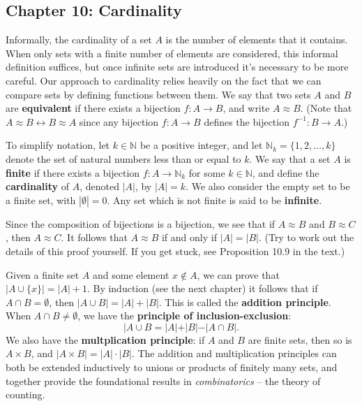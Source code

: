 \documentclass[letterpaper,12pt]{article}
\newcommand{\N}{\mathbb{N}}
\begin{document}
\subsection*{Chapter 10: Cardinality}
Informally, the cardinality of a set $A$ is the number of elements that it contains. When only sets with a finite number of elements are considered, this informal definition suffices, but once infinite sets are introduced it's necessary to be more careful. Our approach to cardinality relies heavily on the fact that we can compare sets by defining functions between them. We say that two sets $A$ and $B$ are {\bf equivalent} if there exists a bijection $f:A\to B$, and write $A\approx B$. (Note that $A\approx B \leftrightarrow B\approx A$ since any bijection $f:A\to B$ defines the bijection $f^{-1}:B\to A$.)

To simplify notation, let $k\in\N$ be a positive integer, and let $\N_k = \{1,2,\ldots, k\}$ denote the set of natural numbers less than or equal to $k$. We say that a set $A$ is {\bf finite} if there exists a bijection $f:A\to \N_k$ for some $k\in\N$, and define the {\bf cardinality} of $A$, denoted $|A|$, by $|A|=k$. We also consider the empty set to be a finite set, with $|\emptyset|=0$. Any set which is not finite is said to be {\bf infinite}.

Since the composition of bijections is a bijection, we see that if $A\approx B$ and $B\approx C$, then $A\approx C$. It follows that $A\approx B$ if and only if $|A| = |B|$. (Try to work out the details of this proof yourself. If you get stuck, see Proposition 10.9 in the text.)

Given a finite set $A$ and some element $x\notin A$, we can prove that $|A\cup \{x\}| = |A|+1$. By induction (see the next chapter) it follows that if $A\cap B = \emptyset$, then $|A\cup B| = |A|+|B|$. This is called the {\bf addition principle}. When $A\cap B \neq \emptyset$, we have the {\bf principle of inclusion-exclusion}:
\[
 |A\cup B = |A| + |B| - |A\cap B|.
\]
We also have the {\bf multplication principle}: if $A$ and $B$ are finite sets, then so is $A\times B$, and $|A\times B| = |A|\cdot|B|$. The addition and multiplication principles can both be extended inductively to unions or products of finitely many sets, and together provide the foundational results in {\em combinatorics} -- the theory of counting.
\end{document}

